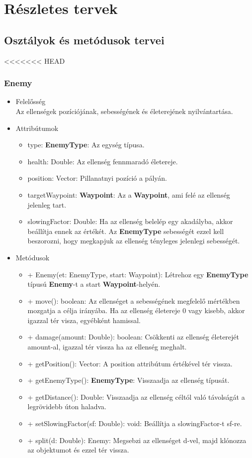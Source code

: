 %
\chapter{Részletes tervek}

\thispagestyle{fancy}

\section{Osztályok és metódusok tervei}

<<<<<<< HEAD
\subsection{Enemy}
\begin{itemize}
\item Felelősség\\
Az ellenségek pozíciójának, sebességének és életerejének nyilvántartása.
\item Attribútumok
	\begin{itemize}
		\item type: \textbf{EnemyType}: Az egység típusa.
		\item health: Double: Az ellenség fennmaradó életereje.
		\item position: Vector: Pillanatnyi pozíció a pályán.
		\item targetWaypoint: \textbf{Waypoint}: Az a \textbf{Waypoint}, ami felé az ellenség jelenleg tart.
		\item slowingFactor: Double: Ha az ellenség belelép egy akadályba, akkor beállítja ennek az értékét. Az \textbf{EnemyType} sebességét ezzel kell beszorozni, hogy megkapjuk az ellenség tényleges jelenlegi sebességét.
	\end{itemize}
\item Metódusok
	\begin{itemize}
		\item + Enemy(et: EnemyType, start: Waypoint): Létrehoz egy \textbf{EnemyType} típusú \textbf{Enemy}-t a start \textbf{Waypoint}-helyén.
		\item + move(): boolean: Az ellenséget a sebességének megfelelő mértékben mozgatja a célja irányába. Ha az ellenség életereje 0 vagy kisebb, akkor igazzal tér visza, egyébként hamissal.
		\item + damage(amount: Double): boolean: Csökkenti az ellenség életerejét amount-al, igazzal tér vissza ha az ellenség meghalt.
		\item + getPosition(): Vector: A position attribútum értékével tér vissza.
		\item + getEnemyType(): \textbf{EnemyType}: Visszaadja az ellenség típusát.
		\item + getDistance(): Double: Visszaadja az ellenség céltól való távolságát a legrövidebb úton haladva.
		\item + setSlowingFactor(sf: Double): void: Beállítja a slowingFactor-t sf-re.
		\item + split(d: Double): Enemy: Megsebzi az ellenséget d-vel, majd klónozza az objektumot és ezzel tér vissza.
	\end{itemize}
\end{itemize}



